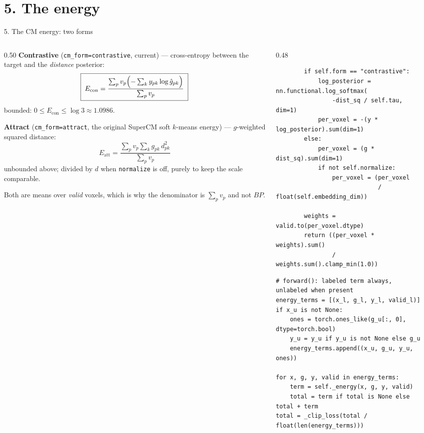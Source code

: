\documentclass[10pt,aspectratio=169]{beamer}
\begin{document}
\section{5. The energy}

\begin{frame}[fragile]{5. The CM energy: two forms}
\begin{columns}[t]
\begin{column}{0.50\textwidth}
\footnotesize
\textbf{Contrastive} (\texttt{cm\_form=contrastive}, current) --- cross-entropy between the target and the
\emph{distance} posterior:
\[
  \boxed{\;
  E_{\mathrm{con}}
  = \frac{\sum_p v_p\Bigl(-\sum_k y_{pk}\log\hat g_{pk}\Bigr)}{\sum_p v_p}
  \;}
\]
bounded: $0 \le E_{\mathrm{con}} \le \log 3 \approx 1.0986$.

\vspace{0.8em}
\textbf{Attract} (\texttt{cm\_form=attract}, the original SuperCM soft $k$-means energy) --- $g$-weighted
squared distance:
\[
  \boxed{\;
  E_{\mathrm{att}}
  = \frac{\sum_p v_p \sum_k g_{pk}\,d^2_{pk}}{\sum_p v_p}
  \;}
\]
unbounded above; divided by $d$ when \texttt{normalize} is off, purely to keep the scale comparable.

\vspace{0.6em}
Both are means over \emph{valid} voxels, which is why the denominator is $\sum_p v_p$ and not $BP$.
\end{column}

\begin{column}{0.48\textwidth}
\begin{lstlisting}
        if self.form == "contrastive":
            log_posterior = nn.functional.log_softmax(
                -dist_sq / self.tau, dim=1)
            per_voxel = -(y * log_posterior).sum(dim=1)
        else:
            per_voxel = (g * dist_sq).sum(dim=1)
            if not self.normalize:
                per_voxel = (per_voxel
                             / float(self.embedding_dim))

        weights = valid.to(per_voxel.dtype)
        return ((per_voxel * weights).sum()
                / weights.sum().clamp_min(1.0))
\end{lstlisting}

\vspace{0.3em}
\begin{lstlisting}
# forward(): labeled term always, unlabeled when present
energy_terms = [(x_l, g_l, y_l, valid_l)]
if x_u is not None:
    ones = torch.ones_like(g_u[:, 0], dtype=torch.bool)
    y_u = y_u if y_u is not None else g_u
    energy_terms.append((x_u, g_u, y_u, ones))

for x, g, y, valid in energy_terms:
    term = self._energy(x, g, y, valid)
    total = term if total is None else total + term
total = _clip_loss(total / float(len(energy_terms)))
\end{lstlisting}
\end{column}
\end{columns}
\end{frame}
\end{document}

